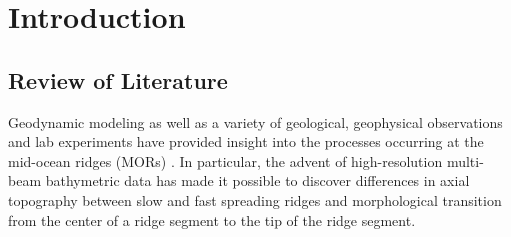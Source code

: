 \pagebreak
\section{Introduction}
\label{ch:Intro}  %

\subsection{Review of Literature}

Geodynamic modeling as well as a variety of geological, geophysical observations and lab experiments have provided insight into the processes occurring at the mid-ocean ridges (MORs) \citep[e.g.,][]{Tucholke1994,Blackman2004,Behn2006,Behn2008,Ito2008,Baines2008,Escartin2008,Canales2008,Dick2008,Dannowski2010,Olive2010,Reston2011a,Reston2011b}. In particular, the advent of high-resolution multi-beam bathymetric data has made it possible to discover differences in axial topography between slow and fast spreading ridges and morphological transition from the center of a ridge segment to the tip of the ridge segment.

